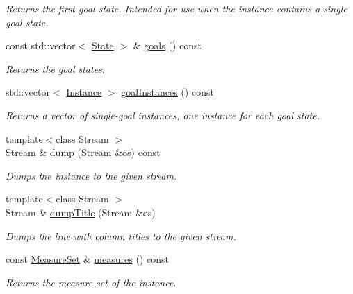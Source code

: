 \begin{DoxyCompactItemize}
\begin{DoxyCompactList}\small\item\em Returns the first goal state. Intended for use when the instance contains a single goal state. \end{DoxyCompactList}\item 
const std\+::vector$<$ \hyperlink{structInstance_a464461e0e371f5f3af9e228751ed265e}{State} $>$ \& \hyperlink{structInstance_ae2adcf7e852ec6ded35c4bf0f6abbd6a}{goals} () const 
\begin{DoxyCompactList}\small\item\em Returns the goal states. \end{DoxyCompactList}\item 
std\+::vector$<$ \hyperlink{structInstance}{Instance} $>$ \hyperlink{structInstance_af04df73a89392265e8af789fdb2718b9}{goal\+Instances} () const 
\begin{DoxyCompactList}\small\item\em Returns a vector of single-\/goal instances, one instance for each goal state. \end{DoxyCompactList}\item 
{\footnotesize template$<$class Stream $>$ }\\Stream \& \hyperlink{structInstance_ae8ad849ae4f42da0ba4a7579c7321409}{dump} (Stream \&os) const 
\begin{DoxyCompactList}\small\item\em Dumps the instance to the given stream. \end{DoxyCompactList}\item 
{\footnotesize template$<$class Stream $>$ }\\Stream \& \hyperlink{structInstance_a346f5c360ef2d78d5974c6f2d562a0b9}{dump\+Title} (Stream \&os)
\begin{DoxyCompactList}\small\item\em Dumps the line with column titles to the given stream. \end{DoxyCompactList}\item 
const \hyperlink{structMeasureSet}{Measure\+Set} \& \hyperlink{structInstance_a907e9f6f47fefc825a390699a7aeeb53}{measures} () const 
\begin{DoxyCompactList}\small\item\em Returns the measure set of the instance. \end{DoxyCompactList}\end{DoxyCompactItemize}

